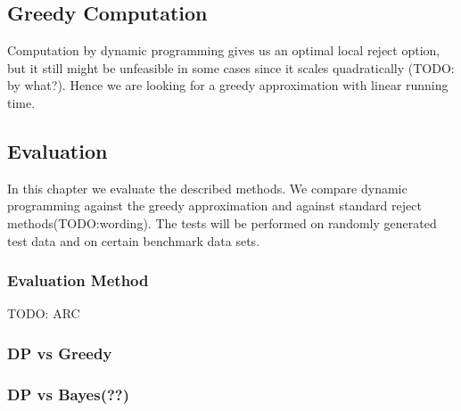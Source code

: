 \subsection{Greedy Computation}
Computation by dynamic programming gives us an optimal local reject option, but it still might be unfeasible in some cases since it scales quadratically (TODO: by what?). Hence we are looking for a greedy approximation with linear running time. 

\subsection{Evaluation}
In this chapter we evaluate the described methods. We compare dynamic programming against the greedy approximation and against standard reject methods(TODO:wording). The tests will be performed on randomly generated test data and on certain benchmark data sets.

\subsubsection{Evaluation Method}
TODO: ARC

\subsubsection{DP vs Greedy}

\subsubsection{DP vs Bayes(??)}